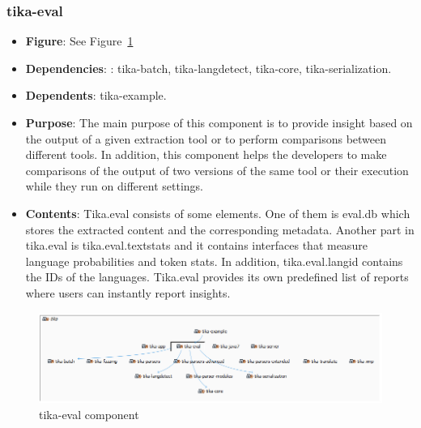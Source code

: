\documentclass{article}
\begin{document}
\subsubsection{tika-eval}
\begin {itemize}
\item \textbf{Figure}: See Figure~\ref{fig:tika-eval}
\item \textbf{Dependencies}: : tika-batch, tika-langdetect, tika-core, tika-serialization.
\item \textbf{Dependents}: tika-example.
\item \textbf{Purpose}: The main purpose of this component is to provide insight based on the output of a given extraction tool or to perform comparisons between different tools. In addition, this component helps the developers to make comparisons of the output of two versions of the same tool or their execution while they run on different settings. 
\item \textbf{Contents}: Tika.eval consists of some elements. One of them is eval.db which stores the extracted content and the corresponding metadata. Another part in tika.eval is tika.eval.textstats and it contains interfaces that measure language probabilities and token stats.  In addition, tika.eval.langid contains the IDs of the languages. Tika.eval provides its own predefined list of reports where users can instantly report insights. 
\end{itemize}
\begin{figure}[ht]
    \centering
    \includegraphics[width=1\textwidth]{report/images/tika-eval.PNG}
    \caption{tika-eval component}
    \label{fig:tika-eval}
\end{figure}
\end{document}
